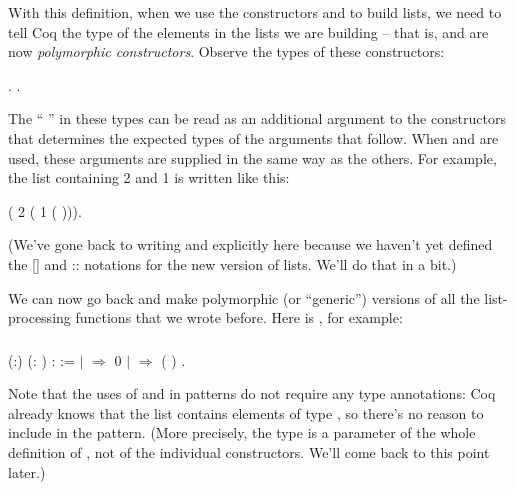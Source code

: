 \documentclass[12pt]{report}
\begin{document}
 With this definition, when we use the constructors  and
     to build lists, we need to tell Coq the type of the
    elements in the lists we are building -- that is,  and 
    are now \textit{polymorphic constructors}.  Observe the types of these
    constructors: \begin{coqdoccode}
\coqdocemptyline
\coqdocnoindent
{} .\coqdoceol
\coqdocnoindent
{} .\coqdoceol
\coqdocemptyline
\end{coqdoccode}
The ``\coqdockw{\ensuremath{\forall}} '' in these types can be read as an additional
    argument to the constructors that determines the expected types of
    the arguments that follow.  When  and  are used, these
    arguments are supplied in the same way as the others.  For
    example, the list containing 2 and 1 is written like this: \begin{coqdoccode}
\coqdocemptyline
\coqdocnoindent
{} (  2 (  1 ( ))).\coqdoceol
\coqdocemptyline
\end{coqdoccode}
(We've gone back to writing  and  explicitly here
    because we haven't yet defined the  []  and :: notations for
    the new version of lists.  We'll do that in a bit.) 

 We can now go back and make polymorphic (or ``generic'')
    versions of all the list-processing functions that we wrote
    before.  Here is , for example: 

\subsubsection{ }

\begin{coqdoccode}
\coqdocemptyline
\coqdocnoindent
{}  (:) (: ) :  :=\coqdoceol
\coqdocindent{1.00em}
  \coqdoceol
\coqdocindent{1.00em}
\ensuremath{|}       \ensuremath{\Rightarrow} 0\coqdoceol
\coqdocindent{1.00em}
\ensuremath{|}    \ensuremath{\Rightarrow}  (  )\coqdoceol
\coqdocindent{1.00em}
.\coqdoceol
\coqdocemptyline
\end{coqdoccode}
Note that the uses of  and  in  patterns
    do not require any type annotations: Coq already knows that the list
     contains elements of type , so there's no reason to include
     in the pattern.  (More precisely, the type  is a parameter
    of the whole definition of , not of the individual
    constructors.  We'll come back to this point later.)
\end{document}
